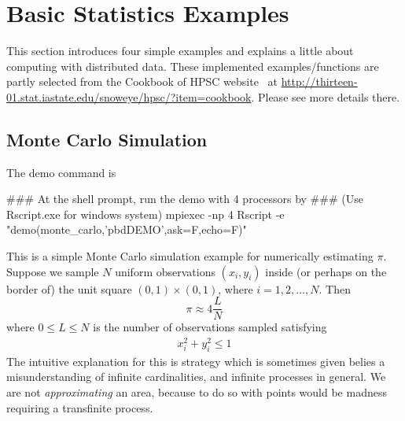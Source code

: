 \section[Basic Statistics Examples]{Basic Statistics Examples}

\label{sec:statistics_examples}

This section introduces four simple examples and explains a little about computing with 
distributed data. 
These implemented examples/functions are partly
selected from the Cookbook of HPSC website~\citep{hpsc2011} at
\url{http://thirteen-01.stat.iastate.edu/snoweye/hpsc/?item=cookbook}.
Please see more details there.

\subsection[Monte Carlo Simulation]{Monte Carlo Simulation}
\label{sec:monte_carlo}

The demo command is
\begin{Command}
### At the shell prompt, run the demo with 4 processors by
### (Use Rscript.exe for windows system)
mpiexec -np 4 Rscript -e "demo(monte_carlo,'pbdDEMO',ask=F,echo=F)"
\end{Command}

This is a simple Monte Carlo simulation example for numerically estimating $\pi$.
Suppose we sample $N$ uniform observations $(x_i, y_i)$ inside (or perhaps on the border of) the unit square $(0, 1)\times (0,1)$,
where $i = 1, 2, \ldots, N$.  Then
\begin{equation}
\pi \approx 4\frac{L}{N}
\label{eqn:pi}
\end{equation}
where $0\leq L\leq N$ is the number of observations sampled satisfying
\begin{align*}
x_i^2+y_i^2 \leq 1
\end{align*}
The intuitive explanation for this is strategy which is sometimes given belies a misunderstanding of infinite cardinalities, and infinite processes in general.  We are not \emph{approximating} an area, because to do so with points would be madness requiring a transfinite process.  

